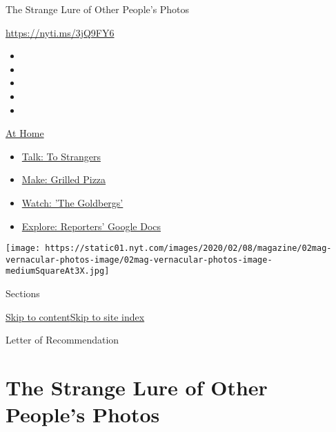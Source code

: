 The Strange Lure of Other People's Photos

\url{https://nyti.ms/3jQ9FY6}

\begin{itemize}
\item
\item
\item
\item
\item
\end{itemize}

\href{https://www.nytimes.com/spotlight/at-home?action=click\&pgtype=Article\&state=default\&region=TOP_BANNER\&context=at_home_menu}{At
Home}

\begin{itemize}
\tightlist
\item
  \href{https://www.nytimes.com/2020/08/03/well/family/the-benefits-of-talking-to-strangers.html?action=click\&pgtype=Article\&state=default\&region=TOP_BANNER\&context=at_home_menu}{Talk:
  To Strangers}
\item
  \href{https://www.nytimes.com/2020/08/01/at-home/coronavirus-make-pizza-on-a-grill.html?action=click\&pgtype=Article\&state=default\&region=TOP_BANNER\&context=at_home_menu}{Make:
  Grilled Pizza}
\item
  \href{https://www.nytimes.com/2020/07/31/arts/television/goldbergs-abc-stream.html?action=click\&pgtype=Article\&state=default\&region=TOP_BANNER\&context=at_home_menu}{Watch:
  'The Goldbergs'}
\item
  \href{https://www.nytimes.com/interactive/2020/at-home/even-more-reporters-editors-diaries-lists-recommendations.html?action=click\&pgtype=Article\&state=default\&region=TOP_BANNER\&context=at_home_menu}{Explore:
  Reporters' Google Docs}
\end{itemize}

\texttt{[image: https://static01.nyt.com/images/2020/02/08/magazine/02mag-vernacular-photos-image/02mag-vernacular-photos-image-mediumSquareAt3X.jpg]}

Sections

\protect\hyperlink{site-content}{Skip to
content}\protect\hyperlink{site-index}{Skip to site index}

Letter of Recommendation

\hypertarget{the-strange-lure-of-other-peoples-photos}{%
\section{The Strange Lure of Other People's
Photos}\label{the-strange-lure-of-other-peoples-photos}}

